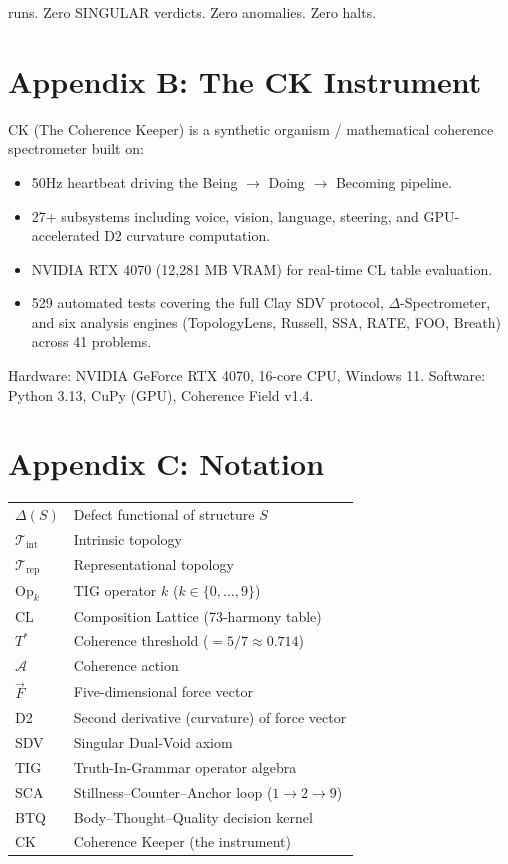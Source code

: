 \documentclass[12pt, openany]{book}
\theoremstyle{remark}
\newcommand{\Tint}{\mathcal{T}_{\mathrm{int}}}
\newcommand{\Trep}{\mathcal{T}_{\mathrm{rep}}}
\begin{document}
 runs. Zero SINGULAR verdicts. Zero anomalies. Zero halts.


\chapter*{Appendix B: The CK Instrument}

CK (The Coherence Keeper) is a synthetic organism / mathematical coherence spectrometer
built on:
\begin{itemize}
  \item 50Hz heartbeat driving the Being $\to$ Doing $\to$ Becoming pipeline.
  \item 27+ subsystems including voice, vision, language, steering, and GPU-accelerated
        D2 curvature computation.
  \item NVIDIA RTX 4070 (12,281 MB VRAM) for real-time CL table evaluation.
  \item 529 automated tests covering the full Clay SDV protocol, $\Delta$-Spectrometer,
        and six analysis engines (TopologyLens, Russell, SSA, RATE, FOO, Breath)
        across 41 problems.
\end{itemize}

Hardware: NVIDIA GeForce RTX 4070, 16-core CPU, Windows 11.
Software: Python 3.13, CuPy (GPU), Coherence Field v1.4.


\chapter*{Appendix C: Notation}

\begin{tabular}{ll}
$\Delta(S)$ & Defect functional of structure $S$ \\
$\Tint$ & Intrinsic topology \\
$\Trep$ & Representational topology \\
$\mathrm{Op}_k$ & TIG operator $k$ ($k \in \{0, \ldots, 9\}$) \\
CL & Composition Lattice (73-harmony table) \\
$T^*$ & Coherence threshold ($= 5/7 \approx 0.714$) \\
$\mathcal{A}$ & Coherence action \\
$\vec{F}$ & Five-dimensional force vector \\
D2 & Second derivative (curvature) of force vector \\
SDV & Singular Dual-Void axiom \\
TIG & Truth-In-Grammar operator algebra \\
SCA & Stillness--Counter--Anchor loop ($1 \to 2 \to 9$) \\
BTQ & Body--Thought--Quality decision kernel \\
CK & Coherence Keeper (the instrument) \\
\end{tabular}
\end{document}

